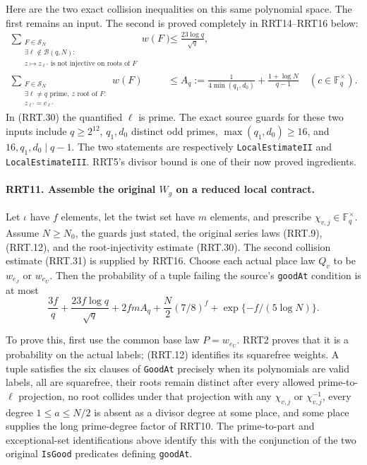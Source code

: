 \documentclass[11pt,a4paper]{article}
\numberwithin{equation}{section}
\theoremstyle{remark}\newtheorem{remark}[theorem]{Remark}
\begin{document}
Here are the two exact collision inequalities on this same
polynomial space.  The first remains an input.  The second
is proved completely in RRT14--RRT16 below:
\begin{align}
 \sum_{\substack{F\in\mathcal S_N\\
   \exists\ell\notin\mathcal B(q,\allowbreak{} N):\\
   z\mapsto z_{\ell'}\text{ is not injective on roots of }F}}
 w(F)&\le\frac{23\log q}{\sqrt q},                 \tag{RRT.30}\\
 \sum_{\substack{F\in\mathcal S_N\\
   \exists\ell\ne q\text{ prime},\ z\text{ root of }F:\\
                         z_{\ell'}=c_{\ell'}}}w(F)
 &\le A_q:=\frac1{4\min(q_1,\allowbreak{} d_0)}
                  +\frac{1+\log N}{q-1}\quad(c\in\mathbb F_q^\times).
                                                        \tag{RRT.31}
\end{align}
In (RRT.30) the quantified $\ell$ is prime.  The exact source
guards for these two inputs include $q\ge2^{12}$,
$q_1,\allowbreak{} d_0$ distinct odd primes, $\max(q_1,\allowbreak{} d_0)\ge16$, and
$16,\allowbreak{} q_1,\allowbreak{} d_0\mid q-1$.  The two statements are respectively
\texttt{Local\allowbreak Estimate\allowbreak II} and \texttt{Local\allowbreak Estimate\allowbreak III}.
RRT5's divisor bound is one of their now proved ingredients.

\paragraph{RRT11. Assemble the original $W_g$ on a reduced local contract.}
\label{claim:RRT11}
Let $\iota$ have $f$ elements, let the twist set have $m$
elements, and prescribe $\chi_{v,\allowbreak{} j}\in\mathbb F_q^\times$.
Assume $N\ge N_0$, the guards just stated, the original
series laws (RRT.9), (RRT.12), and the root-injectivity
estimate (RRT.30).  The second collision estimate (RRT.31)
is supplied by RRT16.  Choose each actual place law $Q_v$ to be
$w_{e_J}$ or $w_{e_U}$.  Then the probability of a tuple failing
the source's \texttt{good\allowbreak At} condition is at most
\[
 \frac{3f}{q}+\frac{23f\log q}{\sqrt q}
       +2fmA_q+\frac N2(7/8)^f
                         +\exp\{-f/(5\log N)\}.
 \tag{RRT.32}
\]

To prove this, first use the common base law $P=w_{e_U}$.
RRT2 proves that it is a probability on the actual labels;
(RRT.12) identifies its squarefree weights.  A tuple satisfies
the six clauses of \texttt{Good\allowbreak At} precisely when its
polynomials are valid labels, all are squarefree, their roots
remain distinct after every allowed prime-to-$\ell$ projection,
no root collides under that projection with any
$\chi_{v,\allowbreak{} j}$ or $\chi_{v,\allowbreak{} j}^{-1}$, every degree
$1\le a\le N/2$ is absent as a divisor degree at some place,
and some place supplies the long prime-degree factor of RRT10.
The prime-to-part and exceptional-set identifications above
identify this with the conjunction of the two original
\texttt{Is\allowbreak Good} predicates defining \texttt{good\allowbreak At}.
\end{document}
